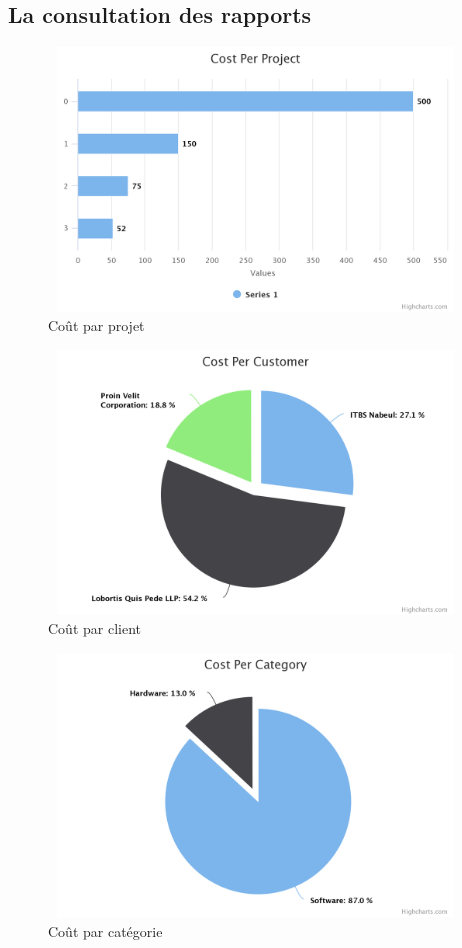 \subsection{La consultation des rapports}


\FloatBarrier
\begin{figure}[H]
\center
\includegraphics[width=11cm,height=7cm]{./figures/pres/cost-per-project.png}
\caption{ Co\^{u}t par projet }
\end{figure}
\FloatBarrier

\FloatBarrier
\begin{figure}[H]
\center
\includegraphics[width=11cm,height=7cm]{./figures/pres/cost-per-customer.png}
\caption{ Co\^{u}t par client }
\end{figure}
\FloatBarrier

\FloatBarrier
\begin{figure}[H]
\center
\includegraphics[width=11cm,height=7cm]{./figures/pres/cost-per-category.png}
\caption{ Co\^{u}t par cat\'{e}gorie}
\end{figure}
\FloatBarrier


